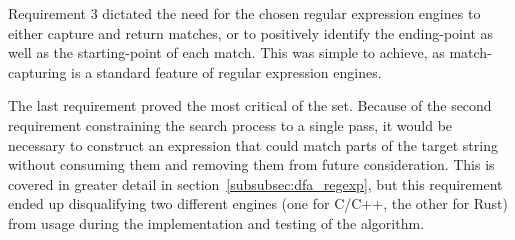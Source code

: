 Requirement 3 dictated the need for the chosen regular expression engines to either capture and return matches, or to positively identify the ending-point as well as the starting-point of each match. This was simple to achieve, as match-capturing is a standard feature of regular expression engines.

The last requirement proved the most critical of the set. Because of the second requirement constraining the search process to a single pass, it would be necessary to construct an expression that could match parts of the target string without consuming them and removing them from future consideration. This is covered in greater detail in section~\ref{subsubsec:dfa_regexp}, but this requirement ended up disqualifying two different engines (one for C/C++, the other for Rust) from usage during the implementation and testing of the algorithm.

